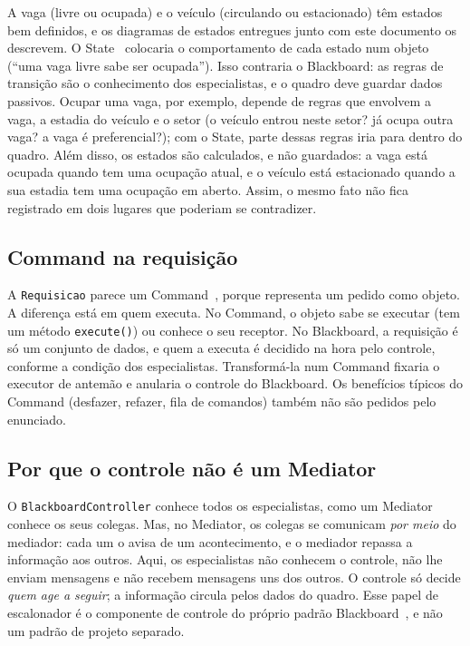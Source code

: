 A vaga (livre ou ocupada) e o veículo (circulando ou estacionado) têm estados bem definidos, e os diagramas de estados entregues junto com este documento os descrevem. O State~\cite{gamma1994} colocaria o comportamento de cada estado num objeto (``uma vaga livre sabe ser ocupada''). Isso contraria o Blackboard: as regras de transição são o conhecimento dos especialistas, e o quadro deve guardar dados passivos. Ocupar uma vaga, por exemplo, depende de regras que envolvem a vaga, a estadia do veículo e o setor (o veículo entrou neste setor? já ocupa outra vaga? a vaga é preferencial?); com o State, parte dessas regras iria para dentro do quadro. Além disso, os estados são calculados, e não guardados: a vaga está ocupada quando tem uma ocupação atual, e o veículo está estacionado quando a sua estadia tem uma ocupação em aberto. Assim, o mesmo fato não fica registrado em dois lugares que poderiam se contradizer.

\subsection{Command na requisição}

A \texttt{Requisicao} parece um Command~\cite{gamma1994}, porque representa um pedido como objeto. A diferença está em quem executa. No Command, o objeto sabe se executar (tem um método \texttt{execute()}) ou conhece o seu receptor. No Blackboard, a requisição é só um conjunto de dados, e quem a executa é decidido na hora pelo controle, conforme a condição dos especialistas. Transformá-la num Command fixaria o executor de antemão e anularia o controle do Blackboard. Os benefícios típicos do Command (desfazer, refazer, fila de comandos) também não são pedidos pelo enunciado.

\subsection{Por que o controle não é um Mediator}

O \texttt{BlackboardController} conhece todos os especialistas, como um Mediator~\cite{gamma1994} conhece os seus colegas. Mas, no Mediator, os colegas se comunicam \emph{por meio} do mediador: cada um o avisa de um acontecimento, e o mediador repassa a informação aos outros. Aqui, os especialistas não conhecem o controle, não lhe enviam mensagens e não recebem mensagens uns dos outros. O controle só decide \emph{quem age a seguir}; a informação circula pelos dados do quadro. Esse papel de escalonador é o componente de controle do próprio padrão Blackboard~\cite{buschmann1996}, e não um padrão de projeto separado.

